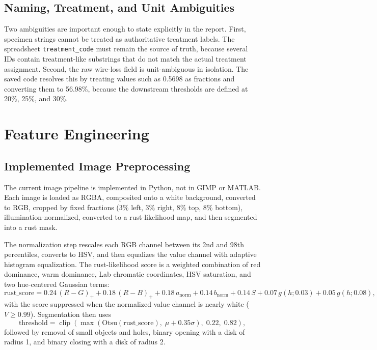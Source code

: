 \documentclass[11pt,a4paper]{article}
\begin{document}
\subsection{Naming, Treatment, and Unit Ambiguities}

Two ambiguities are important enough to state explicitly in the report. First, specimen strings cannot be treated as authoritative treatment labels. The spreadsheet \texttt{treatment\_code} must remain the source of truth, because several IDs contain treatment-like substrings that do not match the actual treatment assignment. Second, the raw wire-loss field is unit-ambiguous in isolation. The saved code resolves this by treating values such as 0.5698 as fractions and converting them to 56.98\%, because the downstream thresholds are defined at 20\%, 25\%, and 30\%.

\section{Feature Engineering}

\subsection{Implemented Image Preprocessing}

The current image pipeline is implemented in Python, not in GIMP or MATLAB. Each image is loaded as RGBA, composited onto a white background, converted to RGB, cropped by fixed fractions (\(3\%\) left, \(3\%\) right, \(8\%\) top, \(8\%\) bottom), illumination-normalized, converted to a rust-likelihood map, and then segmented into a rust mask.

The normalization step rescales each RGB channel between its 2nd and 98th percentiles, converts to HSV, and then equalizes the value channel with adaptive histogram equalization. The rust-likelihood score is a weighted combination of red dominance, warm dominance, Lab chromatic coordinates, HSV saturation, and two hue-centered Gaussian terms:
\[
\text{rust\_score} =
0.24\,(\!R-G\!)_{+}
+ 0.18\,(\!R-B\!)_{+}
+ 0.18\,a_{\mathrm{norm}}
+ 0.14\,b_{\mathrm{norm}}
+ 0.14\,S
+ 0.07\,g(h;0.03)
+ 0.05\,g(h;0.08),
\]
with the score suppressed when the normalized value channel is nearly white (\(V \ge 0.99\)). Segmentation then uses
\[
\text{threshold}=\operatorname{clip}\!\left(\max\!\left(\text{Otsu}(\text{rust\_score}),\; \mu + 0.35\sigma\right),\;0.22,\;0.82\right),
\]
followed by removal of small objects and holes, binary opening with a disk of radius 1, and binary closing with a disk of radius 2.
\end{document}
